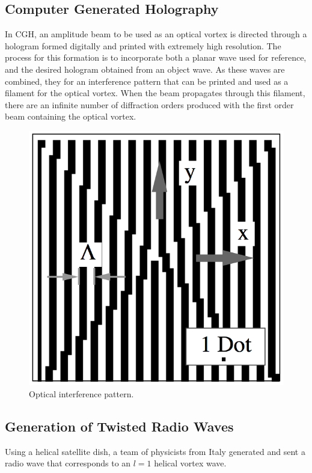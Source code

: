 \documentclass[10pt]{article}
\begin{document}
\subsection*{Computer Generated Holography}
In CGH, an amplitude beam to be used as an optical vortex is directed through a hologram formed digitally and printed with extremely high resolution. The process for this formation is to incorporate both a planar wave used for reference, and the desired hologram obtained from an object wave. As these waves are combined, they for an interference pattern that can be printed and used as a filament for the optical vortex. When the beam propagates through this filament, there are an infinite number of diffraction orders produced with the first order beam containing the optical vortex. \cite{CGH}
\begin{figure}
\centering
\includegraphics[scale=.2]{CGH.jpg}
\caption{Optical interference pattern.}
\label{}
\end{figure}


\newpage
\subsection*{Generation of Twisted Radio Waves}
Using a helical satellite dish, a team of physicists from Italy generated and sent a radio wave that corresponds to an $l=1$ helical vortex wave. 
\end{document}
